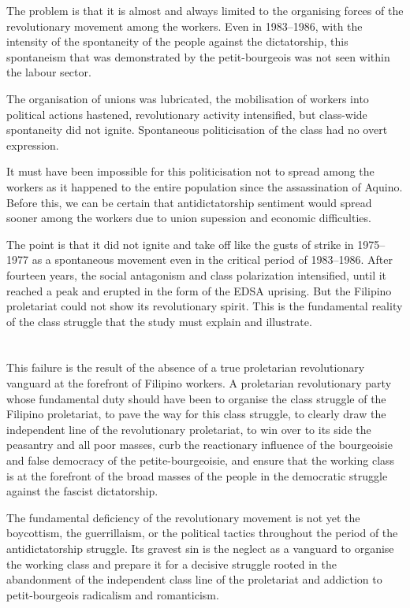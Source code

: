 The problem is that 
it is almost and always limited 
to the organising forces of the revolutionary movement among the workers.
Even in 1983--1986, 
with the intensity of the spontaneity of the people against the dictatorship,
this spontaneism that was demonstrated by the petit-bourgeois
was not seen within the labour sector.

The organisation of unions was lubricated,
the mobilisation of workers
into political actions hastened,
revolutionary activity intensified,
but class-wide spontaneity did not ignite. 
Spontaneous politicisation of the class 
had no overt expression.

It must have been impossible for this politicisation 
not to spread among the workers
as it happened to the entire population 
since the assassination of Aquino. 
Before this, we can be certain
that antidictatorship sentiment 
would spread sooner 
among the workers
due to union supession and economic difficulties.

The point is that it did not ignite and take off 
like the gusts of strike in 1975--1977 
as a spontaneous movement even in the critical period of 1983--1986. 
After fourteen years, 
the social antagonism and class polarization intensified,
until it reached a peak and erupted 
in the form of the EDSA uprising. 
But the Filipino proletariat could not show its revolutionary spirit. 
This is the fundamental reality of the class struggle 
that the study must explain and illustrate.


\section{}
This failure 
is the result 
of the absence 
of a true proletarian revolutionary vanguard
at the forefront of Filipino workers.
A proletarian revolutionary party whose fundamental duty should have been
to organise the class struggle of the Filipino proletariat, 
to pave the way for this class struggle, 
to clearly draw the independent line of the revolutionary proletariat, 
to win over to its side the peasantry and all poor masses, 
curb the reactionary influence of the bourgeoisie 
and false democracy of the petite-bourgeoisie, 
and ensure that the working class 
is at the forefront of the broad masses of the people 
in the democratic struggle against the fascist dictatorship.

The fundamental deficiency of the revolutionary movement 
is not yet the boycottism, 
the guerrillaism, 
or the political tactics 
throughout the period of the antidictatorship struggle. 
Its gravest sin 
is the neglect as a vanguard 
to organise the working class 
and prepare it for a decisive struggle 
rooted in the abandonment of the independent class line of the proletariat
and addiction to petit-bourgeois radicalism and romanticism.

